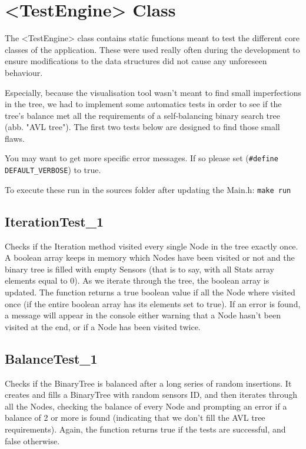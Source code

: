 \documentclass[10pt]{article}
\begin{document}
\section{<TestEngine> Class}
The <TestEngine> class contains static functions meant to test the different core classes of the application. These were used really often during the development to ensure modifications to the data structures did not cause any unforeseen behaviour.

Especially, because the visualisation tool wasn't meant to find small imperfections in the tree, we had to implement some automatics tests in order to see if the tree's balance met all the requirements of a self-balancing binary search tree (abb. "AVL tree"). The first two tests below are designed to find those small flaws.

You may want to get more specific error messages. If so please set (\texttt{\#define DEFAULT\_VERBOSE}) to true.

To execute these run in the sources folder after updating the Main.h:
\texttt{make run}

\subsection{IterationTest\_1}
Checks if the Iteration method visited every single Node in the tree exactly once. A boolean array keeps in memory which Nodes have been visited or not and the binary tree is filled with empty Sensors (that is to say, with all Stats array elements equal to 0). As we iterate through the tree, the boolean array is updated. The function returns a true boolean value if all the Node where visited once (if the entire boolean array has its elements set to true). If an error is found, a message will appear in the console either warning that a Node hasn't been visited at the end, or if a Node has been visited twice.

\subsection{BalanceTest\_1}
Checks if the BinaryTree is balanced after a long series of random insertions. It creates and fills a BinaryTree with random sensors ID, and then iterates through all the Nodes, checking the balance of every Node and prompting an error if a balance of 2 or more is found (indicating that we don't fill the AVL tree requirements). Again, the function returns true if the tests are successful, and false otherwise.
\end{document}
